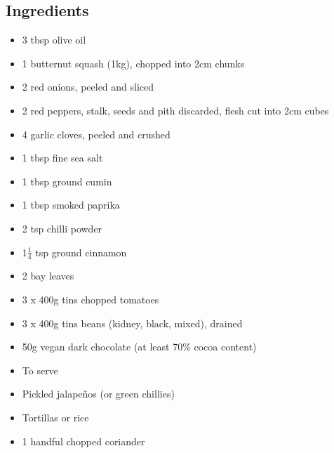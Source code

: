 \documentclass{book}
\begin{document}
\subsection*{Ingredients}
\begin{itemize}
\item 3 tbsp olive oil
\item 1 butternut squash (1kg), chopped into 2cm chunks
\item 2 red onions, peeled and sliced
\item 2 red peppers, stalk, seeds and pith discarded, flesh cut into 2cm cubes
\item 4 garlic cloves, peeled and crushed
\item 1 tbsp fine sea salt
\item 1 tbsp ground cumin
\item 1 tbsp smoked paprika
\item 2 tsp chilli powder
\item 1$\frac{1}{4}$ tsp ground cinnamon
\item 2 bay leaves
\item 3 x 400g tins chopped tomatoes
\item 3 x 400g tins beans (kidney, black, mixed), drained
\item 50g vegan dark chocolate (at least 70\% cocoa content)
\end{itemize}

\begin{itemize}
\item To serve
\item Pickled jalapeños (or green chillies)
\item Tortillas or rice
\item 1 handful chopped coriander
\end{itemize}
\end{document}
